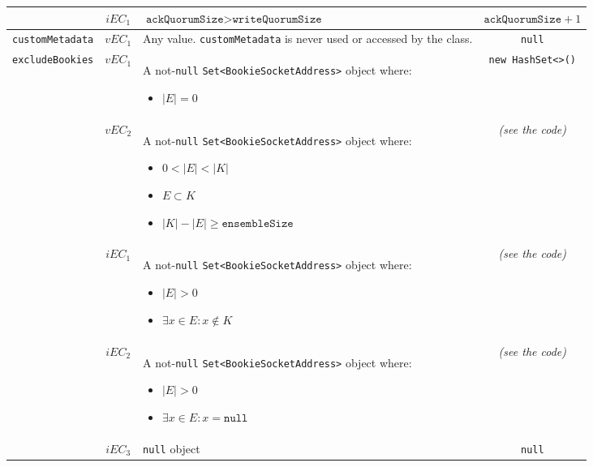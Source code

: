 \documentclass[sigconf]{acmart}
\begin{document}
\begin{table*}
\begin{tabular}{l|cm{10.5cm}|c}
\\\cline{2-4}

& $iEC_1$ & $\texttt{ackQuorumSize} > \texttt{writeQuorumSize}$  & $\texttt{ackQuorumSize} + 1$
	
\\\hline

\texttt{customMetadata} & $vEC_1$ & Any value. \texttt{customMetadata} is never used or accessed by the class. & \texttt{null}

\\\hline

\texttt{excludeBookies} & $vEC_1$ & A not-\texttt{null} \texttt{Set<BookieSocketAddress>} object where:
\begin{itemize}
\item $|E| = 0$
\end{itemize}

& \texttt{new HashSet<>()}

\\\cline{2-4}

& $vEC_2$ & A not-\texttt{null} \texttt{Set<BookieSocketAddress>} object where:
\begin{itemize}
\item $0 < |E| < |K|$
\item $E \subset K$
\item $|K| - |E| \geq \texttt{ensembleSize}$
\end{itemize}

& \textit{(see the code)}

\\\cline{2-4}

& $iEC_1$ & A not-\texttt{null} \texttt{Set<BookieSocketAddress>} object where:
\begin{itemize}
\item $|E| > 0$
\item $\exists x \in E : x \notin K$
\end{itemize}

& \textit{(see the code)}

\\\cline{2-4}

& $iEC_2$ & A not-\texttt{null} \texttt{Set<BookieSocketAddress>} object where:
\begin{itemize}
\item $|E| > 0$
\item $\exists x \in E : x = \texttt{null}$
\end{itemize}

& \textit{(see the code)}

\\\cline{2-4}

& $iEC_3$ & \texttt{null} object  & \texttt{null}

\\

\bottomrule
\end{tabular}
\end{table*}
\end{document}
